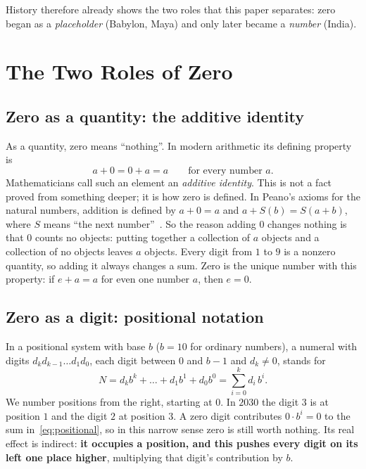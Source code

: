 \documentclass[11pt,a4paper]{article}
\theoremstyle{definition}
\begin{document}
History therefore already shows the two roles that this paper separates: zero began as a \emph{placeholder} (Babylon, Maya) and only later became a \emph{number} (India).

\section{The Two Roles of Zero}\label{sec:roles}

\subsection{Zero as a quantity: the additive identity}
As a quantity, zero means ``nothing''. In modern arithmetic its defining property is
\begin{equation}\label{eq:identity}
  a + 0 = 0 + a = a \qquad \text{for every number } a.
\end{equation}
Mathematicians call such an element an \emph{additive identity}. This is not a fact proved from something deeper; it is how zero is defined. In Peano's axioms for the natural numbers, addition is defined by $a+0=a$ and $a+S(b)=S(a+b)$, where $S$ means ``the next number''~\cite{peano}. So the reason adding $0$ changes nothing is that $0$ counts no objects: putting together a collection of $a$ objects and a collection of no objects leaves $a$ objects. Every digit from $1$ to $9$ is a nonzero quantity, so adding it always changes a sum. Zero is the unique number with this property: if $e+a=a$ for even one number $a$, then $e=0$.

\subsection{Zero as a digit: positional notation}
In a positional system with base $b$ ($b=10$ for ordinary numbers), a numeral with digits $d_k d_{k-1}\dots d_1 d_0$, each digit between $0$ and $b-1$ and $d_k\neq 0$, stands for
\begin{equation}\label{eq:positional}
  N = d_k b^k + \dots + d_1 b^1 + d_0 b^0 = \sum_{i=0}^{k} d_i\, b^i .
\end{equation}
We number positions from the right, starting at $0$. In $2030$ the digit $3$ is at position $1$ and the digit $2$ at position $3$. A zero digit contributes $0\cdot b^i=0$ to the sum in~\eqref{eq:positional}, so in this narrow sense zero is still worth nothing. Its real effect is indirect: \textbf{it occupies a position, and this pushes every digit on its left one place higher}, multiplying that digit's contribution by $b$.
\end{document}
